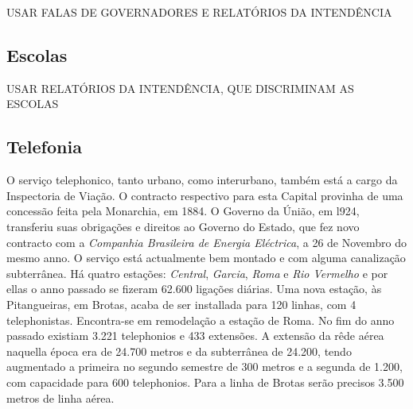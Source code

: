 USAR FALAS DE GOVERNADORES E RELATÓRIOS DA INTENDÊNCIA

\subsection{Escolas}\label{subsec:3.1.7}

USAR RELATÓRIOS DA INTENDÊNCIA, QUE DISCRIMINAM AS ESCOLAS

\subsection{Telefonia}\label{subsec:3.1.8}

\begin{citacao}
O serviço telephonico, tanto urbano, como interurbano, também está a cargo da Inspectoria de Viação.
O contracto respectivo para esta Capital provinha de uma concessão feita pela Monarchia, em 1884.
O Governo da Únião, em l924, transferiu suas obrigações e direitos ao Governo do Estado, que fez novo contracto com a \textit{Companhia Brasileira de Energia Eléctrica}, a 26 de Novembro do mesmo anno.
O serviço está actualmente bem montado e com alguma canalização subterrânea.
Há quatro estações: \textit{Central}, \textit{Garcia}, \textit{Roma} e \textit{Rio Vermelho} e por ellas o anno passado se fizeram 62.600 ligações diárias.
Uma nova estação, às Pitangueiras, em Brotas, acaba de ser installada para 120 linhas, com 4 telephonistas.
Encontra-se em remodelação a estação de Roma.
No fim do anno passado existiam 3.221 telephonios e 433 extensões.
A extensão da rêde aérea naquella época era de 24.700 metros e da subterrânea de 24.200, tendo augmentado a primeira no segundo semestre de 300 metros e a segunda
de 1.200, com capacidade para 600 telephonios.
Para a linha de Brotas serão precisos 3.500 metros de linha aérea. \cite[pp.~266-267]{bahia_rpe_1926}
\end{citacao}